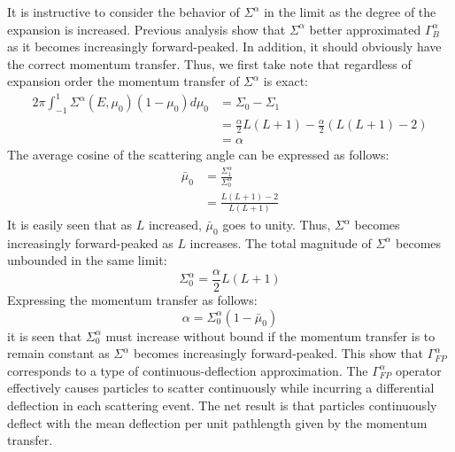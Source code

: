 It is instructive to consider the behavior of $\Sigma^{\alpha}$ in the limit
as the degree of the expansion is increased. Previous analysis show that
$\Sigma^{\alpha}$ better approximated $\Gamma_B^{\alpha}$ as it becomes
increasingly forward-peaked. In addition, it should obviously have the correct
momentum transfer. Thus, we first take note that regardless of expansion order
the momentum transfer of $\Sigma^{\alpha}$ is exact:
\begin{equation}
\begin{split}
2\pi \int_{-1}^1 \Sigma^{\alpha}(E,\mu_0) (1-\mu_0) d\mu_0 &=
\Sigma_0-\Sigma_1\\
&=\frac{\alpha}{2} L(L+1) - \frac{\alpha}{2} (L(L+1)-2)\\
&=\alpha
\end{split}
\end{equation}
The average cosine of the scattering angle can be expressed as follows:
\begin{equation}
\begin{split}
\bar{\mu}_0 &= \frac{\Sigma_1^{\alpha}}{\Sigma_0^{\alpha}}\\
&=\frac{L(L+1)-2}{L(L+1)}
\end{split}
\end{equation}
It is easily seen that as $L$ increased, $\bar{\mu}_0$ goes to unity. Thus,
$\Sigma^{\alpha}$ becomes increasingly forward-peaked as $L$ increases. The
total magnitude of $\Sigma^{\alpha}$ becomes unbounded in the same limit:
\begin{equation}
\Sigma_0^{\alpha} = \frac{\alpha}{2} L (L+1)
\end{equation}
Expressing the momentum transfer as follows:
\begin{equation}
\alpha = \Sigma_0^{\alpha} (1-\bar{\mu}_0)
\end{equation}
it is seen that $\Sigma_0^{\alpha}$ must increase without bound if the
momentum transfer is to remain constant as $\Sigma^{\alpha}$ becomes
increasingly forward-peaked. This show that $\Gamma_{FP}^{\alpha}$ corresponds
to a type of continuous-deflection approximation. The $\Gamma_{FP}^{\alpha}$
operator effectively causes particles to scatter continuously while incurring
a differential deflection in each scattering event. The net result is that
particles continuously deflect with the mean deflection per unit pathlength
given by the momentum transfer.


